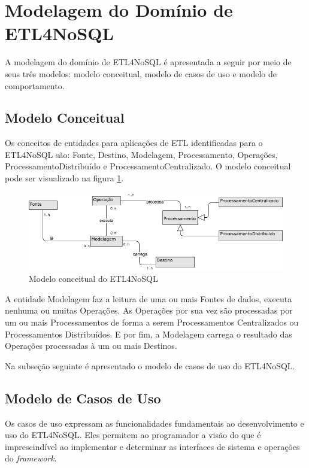 \section{Modelagem do Domínio de ETL4NoSQL}

A modelagem do domínio de ETL4NoSQL é apresentada a seguir por meio de seus três modelos: modelo conceitual, modelo de casos de uso e modelo de comportamento.

\subsection{Modelo Conceitual}

Os conceitos de entidades para aplicações de ETL identificadas para o ETL4NoSQL são: Fonte, Destino, Modelagem, Processamento, Operações, ProcessamentoDistribuído e ProcessamentoCentralizado. O modelo conceitual pode ser visualizado na figura \ref{modeloconceitual}.

\begin{figure}[h]
	\centering
	\includegraphics[scale=0.6]{fig/modeloconceitual.png}
	\caption{Modelo conceitual do ETL4NoSQL}
	\label{modeloconceitual}
\end{figure}

A entidade Modelagem faz a leitura de uma ou mais Fontes de dados, executa nenhuma ou muitas Operações. As Operações por sua vez são processadas por um ou mais Processamentos de forma a serem Processamentos Centralizados ou Processamentos Distribuídos. E por fim, a Modelagem carrega o resultado das Operações processadas à um ou mais Destinos.

Na subseção seguinte é apresentado o modelo de casos de uso do ETL4NoSQL.

\subsection{Modelo de Casos de Uso}

Os casos de uso expressam as funcionalidades fundamentais ao desenvolvimento e uso do ETL4NoSQL. Eles permitem ao programador a visão do que é imprescindível ao implementar e determinar as interfaces de sistema e operações do \textit{framework}. 

